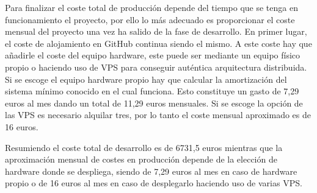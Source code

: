Para finalizar el coste total de producción depende del tiempo que se tenga en funcionamiento el proyecto, por ello lo más adecuado es proporcionar el coste mensual del proyecto una vez ha salido de la fase de desarrollo. En primer lugar, el coste de alojamiento en GitHub continua siendo el mismo. A este coste hay que añadirle el coste del equipo hardware, este puede ser mediante un equipo físico propio o haciendo uso de VPS para conseguir auténtica arquitectura distribuida. Si se escoge el equipo hardware propio hay que calcular la amortización del sistema mínimo conocido en el cual funciona. Esto constituye un gasto de 7,29 euros al mes dando un total de 11,29 euros mensuales. Si se escoge la opción de las VPS es necesario alquilar tres, por lo tanto el coste mensual aproximado es de 16 euros.

Resumiendo el coste total de desarrollo es de 6731,5 euros mientras que la aproximación mensual de costes en producción depende de la elección de hardware donde se despliega, siendo de 7,29 euros al mes en caso de hardware propio o de 16 euros al mes en caso de desplegarlo haciendo uso de varias VPS.